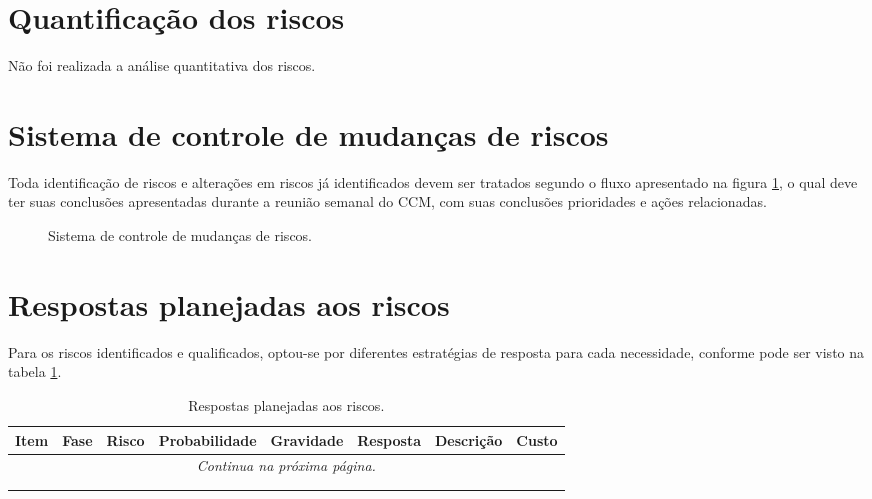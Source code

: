 
\section{Quantificação dos riscos}

Não foi realizada a análise quantitativa dos riscos.

\section{Sistema de controle de mudanças de riscos}
\label{sec:risk-change-control-system}

Toda identificação de riscos e alterações em riscos já identificados devem ser tratados segundo o fluxo apresentado na figura \ref{fig:risk-change-control-system}, o qual deve ter suas conclusões apresentadas durante a reunião semanal do CCM, com suas conclusões prioridades e ações relacionadas.


\begin{figure}[h]
\centering
{}
\caption{Sistema de controle de mudanças de riscos.}
\label{fig:risk-change-control-system}
\end{figure}

\section{Respostas planejadas aos riscos}

Para os riscos identificados e qualificados, optou-se por diferentes estratégias de resposta para cada necessidade, conforme pode ser visto na tabela \ref{tab:risk-answers}.


\begin{longtable}{ l l l l l l l l }
	\toprule
	\textbf{Item} & \textbf{Fase} & \textbf{Risco} & \textbf{Probabilidade} & \textbf{Gravidade} & \textbf{Resposta} & \textbf{Descrição} & \textbf{Custo} \\
	\midrule
	\endhead
	\multicolumn{8}{c}{{\textit{Continua na próxima página.}}} \\
	\endfoot
	\endlastfoot
	  &   &   &   &   &   &   &   \\
	\bottomrule
	\caption{Respostas planejadas aos riscos.}
	\centering
    \label{tab:risk-answers}
\end{longtable}

